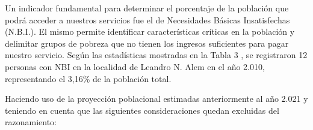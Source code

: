 \documentclass[11pt,a4paper]{article}
\begin{document}
\begin{table}[htbp]
      \caption{salario en pesos promedio en 2.017 y previsto para 2.021.}
  \label{tab:salarios_alem}%
\end{table}%




\begin{table}[htbp]
  \caption{resumen de los distintos grupos económicos.}
  \label{tab:grupos_sueldos_alem}%
\end{table}%


Un indicador fundamental para determinar el porcentaje de la población que podrá acceder a nuestros servicios fue el de Necesidades Básicas Insatisfechas (N.B.I.). 
El mismo permite identificar características críticas en la población y delimitar grupos de pobreza que no tienen los ingresos suficientes para pagar nuestro servicio. 
Según las estadísticas mostradas en la Tabla 3 , se registraron 12 personas con NBI en la localidad de Leandro N. Alem en el año 2.010, representando el 3,16\% de la población total.

Haciendo uso de la proyección poblacional estimadas anteriormente al año 2.021 y teniendo en cuenta que las siguientes consideraciones quedan excluidas del razonamiento:
\end{document}
